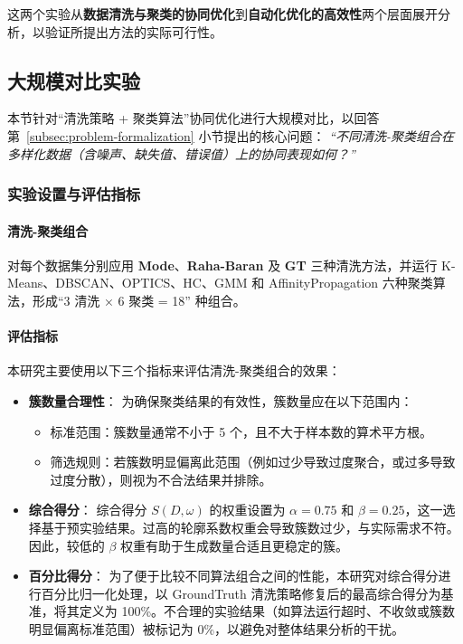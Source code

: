 \documentclass[10pt]{article} %
\numberwithin{equation}{section}
\begin{document}
这两个实验从\textbf{数据清洗与聚类的协同优化}到\textbf{自动化优化的高效性}两个层面展开分析，以验证所提出方法的实际可行性。

\subsection{大规模对比实验}
\label{sec:large_scale_exp}

本节针对“清洗策略 + 聚类算法”协同优化进行大规模对比，以回答第~\ref{subsec:problem-formalization} 小节提出的核心问题：
\emph{“不同清洗-聚类组合在多样化数据（含噪声、缺失值、错误值）上的协同表现如何？”}

\subsubsection{实验设置与评估指标}
\label{sec:exp_setting_largeset}

\paragraph{清洗-聚类组合}
对每个数据集分别应用 \textbf{Mode}、\textbf{Raha-Baran} 及 \textbf{GT} 三种清洗方法，并运行 K-Means、DBSCAN、OPTICS、HC、GMM 和 AffinityPropagation 六种聚类算法，形成“3 清洗 × 6 聚类 = 18” 种组合。

\paragraph{评估指标}
本研究主要使用以下三个指标来评估清洗-聚类组合的效果：

\begin{itemize}
    \item \textbf{簇数量合理性}：  
    为确保聚类结果的有效性，簇数量应在以下范围内：  
    \begin{itemize}
        \item 标准范围：簇数量通常不小于 5 个，且不大于样本数的算术平方根。
        \item 筛选规则：若簇数明显偏离此范围（例如过少导致过度聚合，或过多导致过度分散），则视为不合法结果并排除。
    \end{itemize}
    
    \item \textbf{综合得分}：  
    综合得分 \(S(D,\omega)\) 的权重设置为 \(\alpha = 0.75\) 和 \(\beta = 0.25\)，这一选择基于预实验结果。过高的轮廓系数权重会导致簇数过少，与实际需求不符。因此，较低的 \(\beta\) 权重有助于生成数量合适且更稳定的簇。

    \item \textbf{百分比得分}：  
    为了便于比较不同算法组合之间的性能，本研究对综合得分进行百分比归一化处理，以 GroundTruth 清洗策略修复后的最高综合得分为基准，将其定义为 100\%。不合理的实验结果（如算法运行超时、不收敛或簇数明显偏离标准范围）被标记为 0\%，以避免对整体结果分析的干扰。

\end{itemize}
\end{document}
